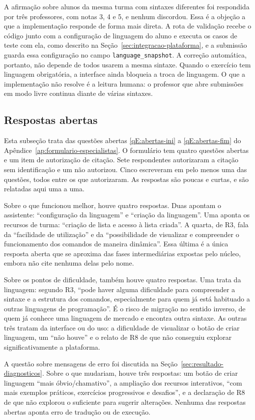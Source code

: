 A afirmação sobre alunos da mesma turma com sintaxes diferentes foi respondida por três professores, com notas 3, 4 e 5, e nenhum discordou. Essa é a objeção a que a implementação responde de forma mais direta. A rota de validação recebe o código junto com a configuração de linguagem do aluno e executa os casos de teste com ela, como descrito na Seção~\ref{sec:integracao-plataforma}, e a submissão guarda essa configuração no campo \texttt{language\_snapshot}. A correção automática, portanto, não depende de todos usarem a mesma sintaxe. Quando o exercício tem linguagem obrigatória, a interface ainda bloqueia a troca de linguagem. O que a implementação não resolve é a leitura humana: o professor que abre submissões em modo livre continua diante de várias sintaxes.

\subsection{Respostas abertas}
\label{sec:resultado-abertas}

Esta subseção trata das questões abertas \ref{qE:abertas-ini} a \ref{qE:abertas-fim} do Apêndice~\ref{ap:formulario-especialistas}. O formulário tem quatro questões abertas e um item de autorização de citação. Sete respondentes autorizaram a citação sem identificação e um não autorizou. Cinco escreveram em pelo menos uma das questões, todos entre os que autorizaram. As respostas são poucas e curtas, e são relatadas aqui uma a uma.

Sobre o que funcionou melhor, houve quatro respostas. Duas apontam o assistente: ``configuração da linguagem'' e ``criação da linguagem''. Uma aponta os recursos de turma: ``criação de lista e acesso à lista criada''. A quarta, de R3, fala da ``facilidade de utilização'' e da ``possibilidade de visualizar e compreender o funcionamento dos comandos de maneira dinâmica''. Essa última é a única resposta aberta que se aproxima das fases intermediárias expostas pelo núcleo, embora não cite nenhuma delas pelo nome.

Sobre os pontos de dificuldade, também houve quatro respostas. Uma trata da linguagem: segundo R3, ``pode haver alguma dificuldade para compreender a sintaxe e a estrutura dos comandos, especialmente para quem já está habituado a outras linguagens de programação''. É o risco de migração no sentido inverso, de quem já conhece uma linguagem de mercado e encontra outra sintaxe. As outras três tratam da interface ou do uso: a dificuldade de visualizar o botão de criar linguagem, um ``não houve'' e o relato de R8 de que não conseguiu explorar significativamente a plataforma.

A questão sobre mensagens de erro foi discutida na Seção~\ref{sec:resultado-diagnosticos}. Sobre o que mudariam, houve três respostas: um botão de criar linguagem ``mais óbvio/chamativo'', a ampliação dos recursos interativos, ``com mais exemplos práticos, exercícios progressivos e desafios'', e a declaração de R8 de que não explorou o suficiente para sugerir alterações. Nenhuma das respostas abertas aponta erro de tradução ou de execução.

